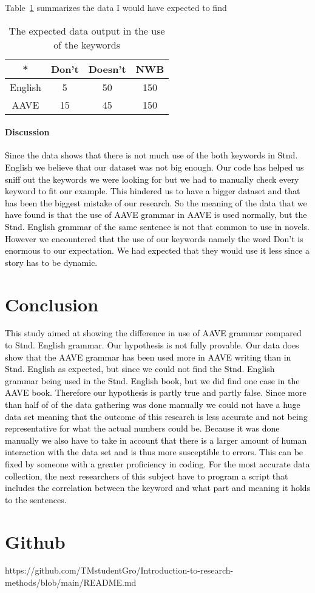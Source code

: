 \documentclass[11pt]{article}
\begin{document}
Table~\ref{tbl:results} summarizes the data I would have expected to find


\begin{table}[hbtp]\centering
\begin{tabular}{|cccc|}
\hline
* & Don't & Doesn't & NWB\\
\hline
English & 5 & 50 & 150\\
AAVE & 15 & 45 & 150\\
\hline
\end{tabular}
\caption{The expected data output in the use of the keywords}
\label{tbl:results}
\end{table}


\paragraph{Discussion} 

\textcolor{black}{Since the data shows that there is not much use of the both keywords in Stnd. English we believe that our dataset was not big enough. Our code has helped us sniff out the keywords we were looking for but we had to manually check every keyword to fit our example. This hindered us to have a bigger dataset and that has been the biggest mistake of our research. So the meaning of the data that we have found is that the use of AAVE grammar in AAVE is used normally, but the Stnd. English grammar of the same sentence is not that common to use in novels. However we encountered that the use of our keywords namely the word Don't is enormous to our expectation. We had expected that they would use it less since a story has to be dynamic.}

\section{Conclusion}

\textcolor{black}{This study aimed at showing the difference in use of AAVE grammar compared to Stnd. English grammar. Our hypothesis is not fully provable. Our data does show that the AAVE grammar has been used more in AAVE writing than in Stnd. English as expected, but since we could not find the Stnd. English grammar being used in the Stnd. English book, but we did find one case in the AAVE book. Therefore our hypothesis is partly true and partly false. Since more than half of of the data gathering was done manually we could not have a huge data set meaning that the outcome of this research is less accurate and not being representative for what the actual numbers could be. Because it was done manually we also have to take in account that there is a larger amount of human interaction with the data set and is thus more susceptible to errors. This can be fixed by someone with a greater proficiency in coding. For the most accurate data collection, the next researchers of this subject have to program a script that includes the correlation between the keyword and what part and meaning it holds to the sentences.}

\section{Github}
{https://github.com/TMstudentGro/Introduction-to-research-methods/blob/main/README.md}



\end{document}
